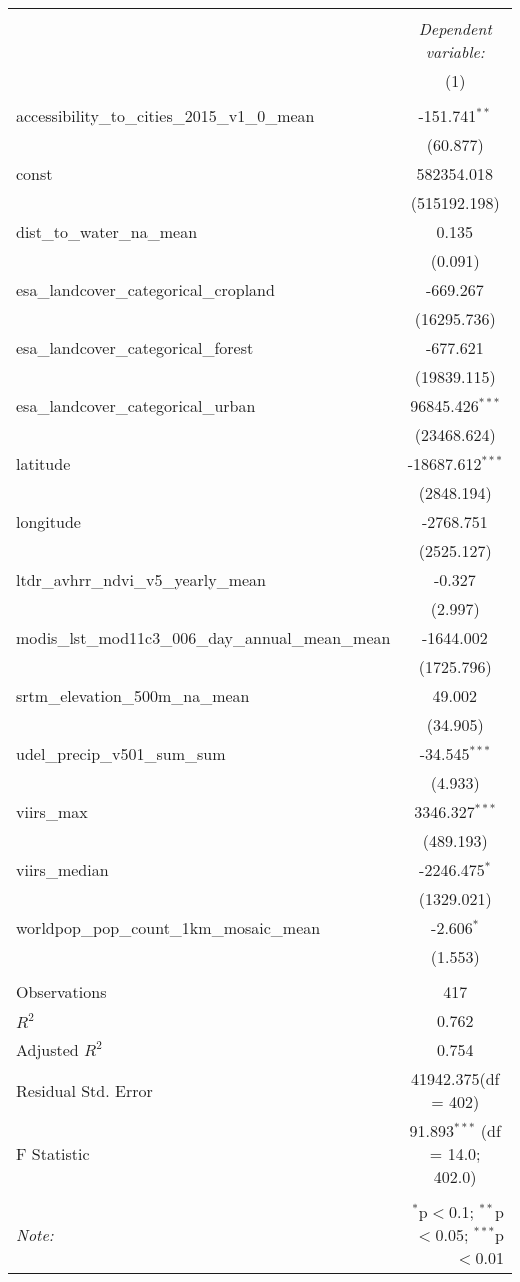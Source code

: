 \begin{table}[!htbp] \centering
\begin{tabular}{@{\extracolsep{5pt}}lc}
\\[-1.8ex]\hline
\hline \\[-1.8ex]
& \multicolumn{1}{c}{\textit{Dependent variable:}} \
\cr \cline{1-2}
\\[-1.8ex] & (1) \\
\hline \\[-1.8ex]
 accessibility_to_cities_2015_v1_0_mean & -151.741$^{**}$ \\
  & (60.877) \\
 const & 582354.018$^{}$ \\
  & (515192.198) \\
 dist_to_water_na_mean & 0.135$^{}$ \\
  & (0.091) \\
 esa_landcover_categorical_cropland & -669.267$^{}$ \\
  & (16295.736) \\
 esa_landcover_categorical_forest & -677.621$^{}$ \\
  & (19839.115) \\
 esa_landcover_categorical_urban & 96845.426$^{***}$ \\
  & (23468.624) \\
 latitude & -18687.612$^{***}$ \\
  & (2848.194) \\
 longitude & -2768.751$^{}$ \\
  & (2525.127) \\
 ltdr_avhrr_ndvi_v5_yearly_mean & -0.327$^{}$ \\
  & (2.997) \\
 modis_lst_mod11c3_006_day_annual_mean_mean & -1644.002$^{}$ \\
  & (1725.796) \\
 srtm_elevation_500m_na_mean & 49.002$^{}$ \\
  & (34.905) \\
 udel_precip_v501_sum_sum & -34.545$^{***}$ \\
  & (4.933) \\
 viirs_max & 3346.327$^{***}$ \\
  & (489.193) \\
 viirs_median & -2246.475$^{*}$ \\
  & (1329.021) \\
 worldpop_pop_count_1km_mosaic_mean & -2.606$^{*}$ \\
  & (1.553) \\
\hline \\[-1.8ex]
 Observations & 417 \\
 $R^2$ & 0.762 \\
 Adjusted $R^2$ & 0.754 \\
 Residual Std. Error & 41942.375(df = 402)  \\
 F Statistic & 91.893$^{***}$ (df = 14.0; 402.0) \\
\hline
\hline \\[-1.8ex]
\textit{Note:} & \multicolumn{1}{r}{$^{*}$p$<$0.1; $^{**}$p$<$0.05; $^{***}$p$<$0.01} \\
\end{tabular}
\end{table}